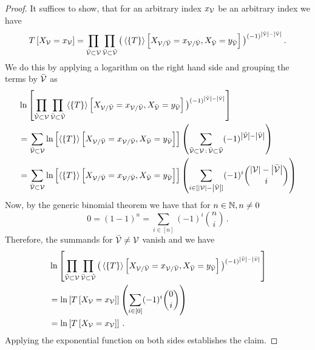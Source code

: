 \begin{proof}
	It suffices to show, that for an arbitrary index $x_{\mathcal{V}}$ be an arbitrary index we have
	\begin{align*}
		T\left[X_{\mathcal{V}}=x_{\mathcal{V}}\right]
		= \prod_{\tilde{\mathcal{V}}\subset\mathcal{V}} \prod_{\bar{\mathcal{V}}\subset\tilde{\mathcal{V}}}
			\big(\left\langle \left\{T\right\}\right\rangle \left[ X_{\mathcal{V}/\bar{\mathcal{V}}}=x_{\mathcal{V}/\bar{\mathcal{V}}}, X_{\bar{\mathcal{V}}} = y_{\bar{\mathcal{V}}} \right]\big)^{(-1)^{\left|\tilde{\mathcal{V}}\right|-\left|\bar{\mathcal{V}}\right|}} \, .
	\end{align*}
	We do this by applying a logarithm on the right hand side and grouping the terms by $\bar{\mathcal{V}}$ as
	\begin{align*}
		& \ln \left[ \prod_{\tilde{\mathcal{V}}\subset\mathcal{V}} \prod_{\bar{\mathcal{V}}\subset\tilde{\mathcal{V}}}
			\left\langle \left\{T\right\}\right\rangle \left[ X_{\mathcal{V}/\bar{\mathcal{V}}}=x_{\mathcal{V}/\bar{\mathcal{V}}}, X_{\bar{\mathcal{V}}} = y_{\bar{\mathcal{V}}} \right]\big)^{(-1)^{\left|\tilde{\mathcal{V}}\right|-\left|\bar{\mathcal{V}}\right|}} \right] \\
		& = \sum_{\bar{\mathcal{V}}\subset\mathcal{V}} \ln \left[ \left\langle \left\{T\right\}\right\rangle \left[ X_{\mathcal{V}/\bar{\mathcal{V}}}=x_{\mathcal{V}/\bar{\mathcal{V}}}, X_{\bar{\mathcal{V}}} = y_{\bar{\mathcal{V}}} \right] \right] 
		\left( \sum_{\tilde{\mathcal{V}}\subset\mathcal{V} \, : \, \bar{\mathcal{V}}\subset \tilde{\mathcal{V}}} (-1)^{\left|\tilde{\mathcal{V}}\right|-\left|\bar{\mathcal{V}}\right|} \right) \\
		& =  \sum_{\bar{\mathcal{V}}\subset\mathcal{V}} \ln \left[ \left\langle \left\{T\right\}\right\rangle \left[ X_{\mathcal{V}/\bar{\mathcal{V}}}=x_{\mathcal{V}/\bar{\mathcal{V}}}, X_{\bar{\mathcal{V}}} = y_{\bar{\mathcal{V}}} \right] \right] 
		\left( \sum_{i \in [\left|\mathcal{V}\right|-\left|\bar{\mathcal{V}}\right|]}  (-1)^{i}  \binom{\left|\mathcal{V}\right|-\left|\bar{\mathcal{V}}\right|}{i}  \right) 
	\end{align*}
	Now, by the generic binomial theorem we have that for $n\in\mathbb{N}, n \neq 0$
		\[ 0 = (1-1)^n = \sum_{i \in [n]}  (-1)^{i}  \binom{n}{i}   \, . \]
	Therefore, the summands for $\bar{\mathcal{V}}\neq\mathcal{V}$ vanish and we have 
	\begin{align*}
			& \ln \left[  \prod_{\tilde{\mathcal{V}}\subset\mathcal{V}} \prod_{\bar{\mathcal{V}}\subset\tilde{\mathcal{V}}}
			\big(\left\langle \left\{T\right\}\right\rangle \left[ X_{\mathcal{V}/\bar{\mathcal{V}}}=x_{\mathcal{V}/\bar{\mathcal{V}}}, X_{\bar{\mathcal{V}}} = y_{\bar{\mathcal{V}}} \right]\big)^{(-1)^{\left|\tilde{\mathcal{V}}\right|-\left|\bar{\mathcal{V}}\right|}}  \right] \\
			& = \ln \left[ T\left[X_{\mathcal{V}}=x_{\mathcal{V}}\right] \right]
			\left( \sum_{i \in [0]}  (-1)^{i}  \binom{0}{i}  \right) \\
			& = \ln \left[ T\left[X_{\mathcal{V}}=x_{\mathcal{V}}\right] \right] \, . 
	\end{align*}
	Applying the exponential function on both sides establishes the claim.
\end{proof}


